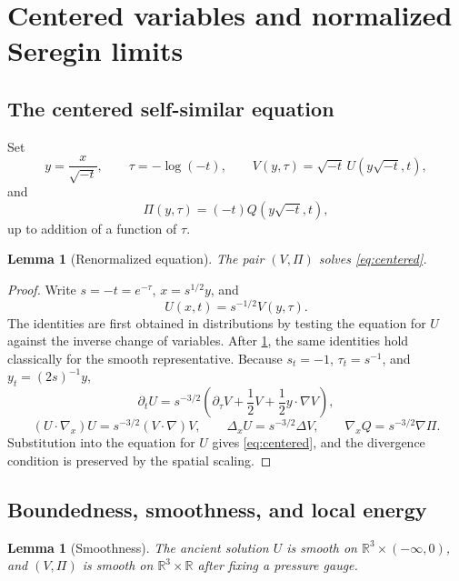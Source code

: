\documentclass[11pt]{amsart}
\theoremstyle{plain}
\newtheorem{lemma}[theorem]{Lemma}
\theoremstyle{definition}
\theoremstyle{remark}
\numberwithin{equation}{section}
\newcommand{\R}{\mathbb R}
\begin{document}
\section{Centered variables and normalized Seregin limits}\label{sec:seregin}

\subsection{The centered self-similar equation}

Set
\[
   y=\frac{x}{\sqrt{-t}},\qquad
   \tau=-\log(-t),\qquad
   V(y,\tau)=\sqrt{-t}\,U(y\sqrt{-t},t),
\]
and
\[
   \Pi(y,\tau)=(-t)Q(y\sqrt{-t},t),
\]
up to addition of a function of \(\tau\).

\begin{lemma}[Renormalized equation]\label{lem:renormalized-equation}
The pair \((V,\Pi)\) solves \eqref{eq:centered}.
\end{lemma}

\begin{proof}
Write \(s=-t=e^{-\tau}\), \(x=s^{1/2}y\), and
\[
   U(x,t)=s^{-1/2}V(y,\tau).
\]
The identities are first obtained in distributions by testing the equation
for \(U\) against the inverse change of variables.  After
\cref{lem:smoothness}, the same identities hold classically for the smooth
representative.  Because \(s_t=-1\),
\(\tau_t=s^{-1}\), and \(y_t=(2s)^{-1}y\),
\[
   \partial_tU
   =
   s^{-3/2}\left(\partial_\tau V+\frac12V+\frac12y\cdot\nabla V\right),
\]
\[
   (U\cdot\nabla_x)U=s^{-3/2}(V\cdot\nabla)V,\qquad
   \Delta_xU=s^{-3/2}\Delta V,\qquad
   \nabla_xQ=s^{-3/2}\nabla\Pi.
\]
Substitution into the equation for \(U\) gives \eqref{eq:centered}, and the
divergence condition is preserved by the spatial scaling.
\end{proof}

\subsection{Boundedness, smoothness, and local energy}

\begin{lemma}[Smoothness]\label{lem:smoothness}
The ancient solution \(U\) is smooth on \(\R^3\times(-\infty,0)\), and
\((V,\Pi)\) is smooth on \(\R^3\times\R\) after fixing a pressure gauge.
\end{lemma}
\end{document}
